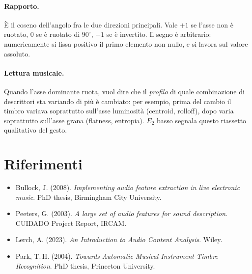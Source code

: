 \documentclass[a4paper,11pt]{article}
\begin{document}
\paragraph{Rapporto.} È il coseno dell'angolo fra le due direzioni
principali. Vale $+1$ se l'asse non è ruotato, $0$ se è ruotato di
$90^\circ$, $-1$ se è invertito. Il segno è arbitrario: numericamente si
fissa positivo il primo elemento non nullo, e si lavora sul valore
assoluto.

\paragraph{Lettura musicale.} Quando l'asse dominante ruota, vuol dire
che il \emph{profilo} di quale combinazione di descrittori sta variando
di più è cambiato: per esempio, prima del cambio il timbro variava
soprattutto sull'asse luminosità (centroid, rolloff), dopo varia
soprattutto sull'asse grana (flatness, entropia). $E_2$ basso
segnala questo riassetto qualitativo del gesto.

\section{Riferimenti}

\begin{itemize}[nosep]
  \item Bullock, J. (2008). \emph{Implementing audio feature extraction
        in live electronic music}. PhD thesis, Birmingham City University.
  \item Peeters, G. (2003). \emph{A large set of audio features for sound
        description}. CUIDADO Project Report, IRCAM.
  \item Lerch, A. (2023). \emph{An Introduction to Audio Content Analysis}.
        Wiley.
  \item Park, T.\,H. (2004). \emph{Towards Automatic Musical Instrument
        Timbre Recognition}. PhD thesis, Princeton University.
\end{itemize}
\end{document}
